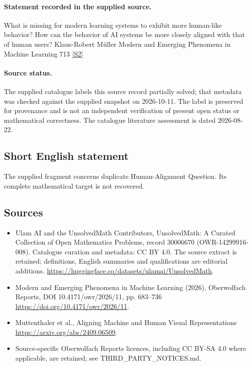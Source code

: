 \documentclass[11pt]{article}
\newcommand{\sref}[2]{\hyperlink{source:#1:#2}{[S#2]}}
\begin{document}
\paragraph{Statement recorded in the supplied source.}
What is missing for modern learning systems to exhibit more human-like behavior? How can the behavior of AI systems be more closely aligned with that of human users? Klaus-Robert Müller Modern and Emerging Phenomena in Machine Learning 713 \sref{30006670}{2}
\paragraph{Source status.}
The supplied catalogue labels this source record partially solved; that metadata was checked against the supplied snapshot on 2026-10-11. The label is preserved for provenance and is not an independent verification of present open status or mathematical correctness. The catalogue literature assessment is dated 2026-08-22.
\subsection{Short English statement}
The supplied fragment concerns duplicate Human-Alignment Question. Its complete mathematical target is not recovered.
\subsection{Sources}
\begin{itemize}
\item[\hypertarget{source:30006670:1}{S1}] Ulam AI and the UnsolvedMath Contributors, UnsolvedMath: A Curated Collection of Open Mathematics Problems, record 30006670 (OWR-14299916-008). Catalogue curation and metadata: CC BY 4.0. The source extract is retained; definitions, English summaries and qualifications are editorial additions.
\url{https://huggingface.co/datasets/ulamai/UnsolvedMath}.
\item[\hypertarget{source:30006670:2}{S2}] Modern and Emerging Phenomena in Machine Learning (2026), Oberwolfach Reports, DOI 10.4171/owr/2026/11, pp. 683--736
\url{https://doi.org/10.4171/owr/2026/11}.
\item[\hypertarget{source:30006670:3}{S3}] Muttenthaler et al., Aligning Machine and Human Visual Representations
\url{https://arxiv.org/abs/2409.06509}.
\item Source-specific Oberwolfach Reports licences, including CC BY-SA 4.0 where applicable, are retained; see THIRD\_PARTY\_NOTICES.md.
\end{itemize}
\end{document}
